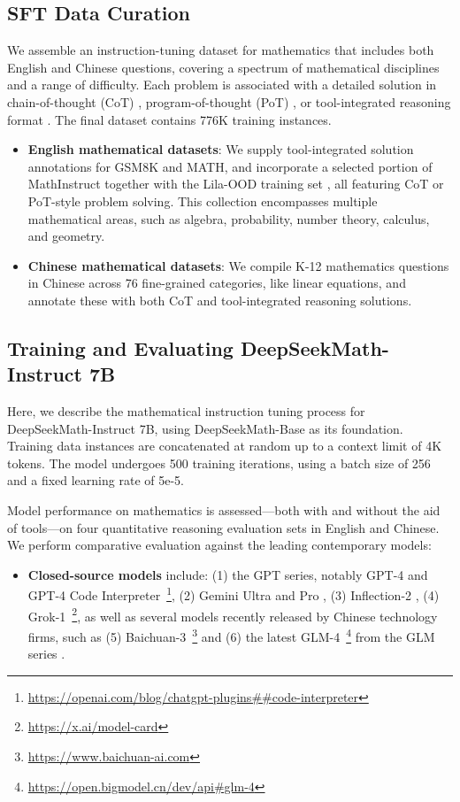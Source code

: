 \subsection{SFT Data Curation}

We assemble an instruction-tuning dataset for mathematics that includes both English and Chinese questions, covering a spectrum of mathematical disciplines and a range of difficulty. Each problem is associated with a detailed solution in chain-of-thought (CoT) \citep{cot}, program-of-thought (PoT) \citep{pot,pal}, or tool-integrated reasoning format \citep{tora}. The final dataset contains 776K training instances.

\begin{itemize}[topsep=0pt]
    \item \textbf{English mathematical datasets}: We supply tool-integrated solution annotations for GSM8K and MATH, and incorporate a selected portion of MathInstruct \citep{MathInstruct} together with the Lila-OOD training set \citep{lila}, all featuring CoT or PoT-style problem solving. This collection encompasses multiple mathematical areas, such as algebra, probability, number theory, calculus, and geometry.
    \item \textbf{Chinese mathematical datasets}: We compile K-12 mathematics questions in Chinese across 76 fine-grained categories, like linear equations, and annotate these with both CoT and tool-integrated reasoning solutions.
\end{itemize}

\subsection{Training and Evaluating DeepSeekMath-Instruct 7B}

Here, we describe the mathematical instruction tuning process for DeepSeekMath-Instruct 7B, using DeepSeekMath-Base as its foundation. Training data instances are concatenated at random up to a context limit of 4K tokens. The model undergoes 500 training iterations, using a batch size of 256 and a fixed learning rate of 5e-5.

Model performance on mathematics is assessed—both with and without the aid of tools—on four quantitative reasoning evaluation sets in English and Chinese. We perform comparative evaluation against the leading contemporary models:

\begin{itemize}[topsep=0pt]
    \item \textbf{Closed-source models} include: (1) the GPT series, notably GPT-4 \citep{gpt4} and GPT-4 Code Interpreter~\footnote{\url{https://openai.com/blog/chatgpt-plugins\#\#code-interpreter}}, (2) Gemini Ultra and Pro \citep{gemini}, (3) Inflection-2 \citep{inflection-2}, (4) Grok-1~\footnote{\url{https://x.ai/model-card}}, as well as several models recently released by Chinese technology firms, such as (5) Baichuan-3~\footnote{\url{https://www.baichuan-ai.com}} and (6) the latest GLM-4~\footnote{\url{https://open.bigmodel.cn/dev/api\#glm-4}} from the GLM series \citep{glm}.
\end{itemize}

